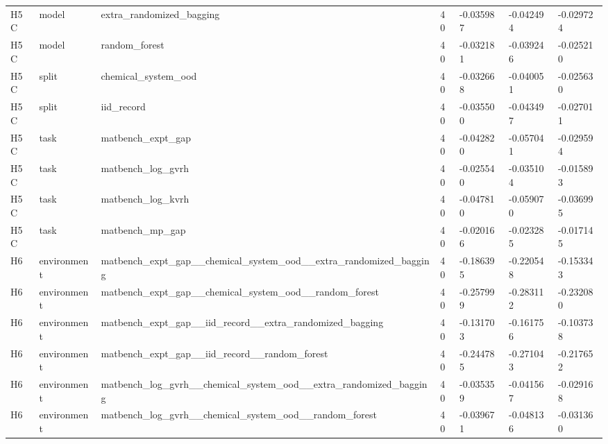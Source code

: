 \documentclass[10pt]{article}
\begin{document}
\begin{landscape}
\begin{longtable}{L{.35in}L{.6in}L{3.55in}L{.4in}L{.88in}L{.88in}L{.88in}}
H5C & model & extra\_\allowbreak{}randomized\_\allowbreak{}bagging & 40 & -0.035987 & -0.042494 & -0.029724\\
H5C & model & random\_\allowbreak{}forest & 40 & -0.032181 & -0.039246 & -0.025210\\
H5C & split & chemical\_\allowbreak{}system\_\allowbreak{}ood & 40 & -0.032668 & -0.040051 & -0.025630\\
H5C & split & iid\_\allowbreak{}record & 40 & -0.035500 & -0.043497 & -0.027011\\
H5C & task & matbench\_\allowbreak{}expt\_\allowbreak{}gap & 40 & -0.042820 & -0.057041 & -0.029594\\
H5C & task & matbench\_\allowbreak{}log\_\allowbreak{}gvrh & 40 & -0.025540 & -0.035104 & -0.015893\\
H5C & task & matbench\_\allowbreak{}log\_\allowbreak{}kvrh & 40 & -0.047810 & -0.059070 & -0.036995\\
H5C & task & matbench\_\allowbreak{}mp\_\allowbreak{}gap & 40 & -0.020166 & -0.023285 & -0.017145\\
H6 & environment & matbench\_\allowbreak{}expt\_\allowbreak{}gap\_\allowbreak{}\_\allowbreak{}chemical\_\allowbreak{}system\_\allowbreak{}ood\_\allowbreak{}\_\allowbreak{}extra\_\allowbreak{}randomized\_\allowbreak{}bagging & 40 & -0.186395 & -0.220548 & -0.153343\\
H6 & environment & matbench\_\allowbreak{}expt\_\allowbreak{}gap\_\allowbreak{}\_\allowbreak{}chemical\_\allowbreak{}system\_\allowbreak{}ood\_\allowbreak{}\_\allowbreak{}random\_\allowbreak{}forest & 40 & -0.257999 & -0.283112 & -0.232080\\
H6 & environment & matbench\_\allowbreak{}expt\_\allowbreak{}gap\_\allowbreak{}\_\allowbreak{}iid\_\allowbreak{}record\_\allowbreak{}\_\allowbreak{}extra\_\allowbreak{}randomized\_\allowbreak{}bagging & 40 & -0.131703 & -0.161756 & -0.103738\\
H6 & environment & matbench\_\allowbreak{}expt\_\allowbreak{}gap\_\allowbreak{}\_\allowbreak{}iid\_\allowbreak{}record\_\allowbreak{}\_\allowbreak{}random\_\allowbreak{}forest & 40 & -0.244785 & -0.271043 & -0.217652\\
H6 & environment & matbench\_\allowbreak{}log\_\allowbreak{}gvrh\_\allowbreak{}\_\allowbreak{}chemical\_\allowbreak{}system\_\allowbreak{}ood\_\allowbreak{}\_\allowbreak{}extra\_\allowbreak{}randomized\_\allowbreak{}bagging & 40 & -0.035359 & -0.041567 & -0.029168\\
H6 & environment & matbench\_\allowbreak{}log\_\allowbreak{}gvrh\_\allowbreak{}\_\allowbreak{}chemical\_\allowbreak{}system\_\allowbreak{}ood\_\allowbreak{}\_\allowbreak{}random\_\allowbreak{}forest & 40 & -0.039671 & -0.048136 & -0.031360\\

\end{longtable}
\end{landscape}
\end{document}
